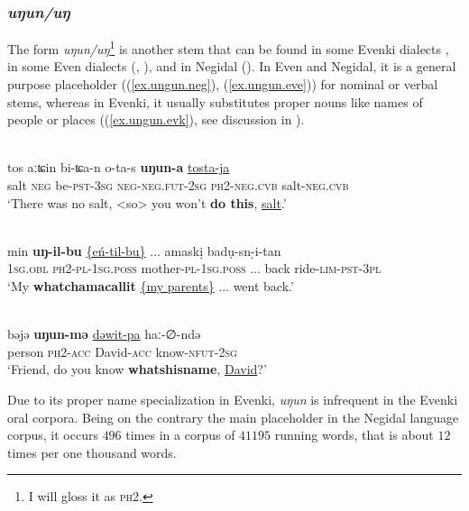 \documentclass[output=paper,colorlinks,citecolor=brown
\ChapterDOI{10.5281/zenodo.15697577}
]{langscibook}
\begin{document}
\subsubsection{\textit{uŋun/uŋ}}

The form \textit{uŋun/uŋ}\footnote{I will gloss it as \textsc{ph2.}} is another stem that can be found in some Evenki dialects \citep{klyachko2022}, in some Even dialects (\citealt{matic2008}, \citealt[271]{robbek2005}), and in Negidal (\cite{chapters/pakendorf}).
In Even and Negidal, it is a general purpose placeholder ((\ref{ex.ungun.neg}), (\ref{ex.ungun.eve})) for nominal or verbal stems, whereas in Evenki, it usually substitutes proper nouns like names of people or places ((\ref{ex.ungun.evk}), see discussion in \citet{klyachko2022}).


 \ea \label{ex.ungun.neg}
 \\
 \gll tos aːʨin bi-ʨa-n o-ta-s \textbf{uŋun-a} \uline{tosta-ja}\\
		salt \textsc{neg} be-\textsc{pst}-\textsc{3sg} \textsc{neg}-\textsc{neg}.\textsc{fut}-\textsc{2sg} \textsc{ph2}-\textsc{neg}.\textsc{cvb} salt-\textsc{neg}.\textsc{cvb}\\
		\glt ‘There was no salt, <so> you won’t \textbf{do this}, \uline{salt}.'
 \z
{}


 \ea \label{ex.ungun.eve}
 \\
 \gll min \textbf{uŋ-il-bu} \uline{\{eń-til-bu\}} ... amaskị badụ-sn-̣i-tan\\
 \textsc{1sg}.\textsc{obl} \textsc{ph2}-\textsc{pl}-\textsc{1sg.poss} mother-\textsc{pl}-\textsc{1sg.poss} ... back ride-\textsc{lim}-\textsc{pst}-\textsc{3pl}\\
 \glt `My \textbf{whatchamacallit} \uline{\{my parents\}} ... went back.'
 \z

 \ea \label{ex.ungun.evk}
 \\
 \gll bəjə	\textbf{uŋun-mə} \uline{dəwit-pa} haː-∅-ndə\\
 person	\textsc{ph2}-\textsc{acc}	David-\textsc{acc}	know-\textsc{nfut}-2\textsc{sg}\\
 \glt `Friend, do you know \textbf{whatshisname}, \uline{David}?'
 \z
{}

Due to its proper name specialization in Evenki, \textit{uŋun} is infrequent in the Evenki oral corpora. Being on the contrary the main placeholder in the Negidal language corpus, it occurs $496$ times in a corpus of $41 195$ running words, that is about $12$ times per one thousand words.
\end{document}
